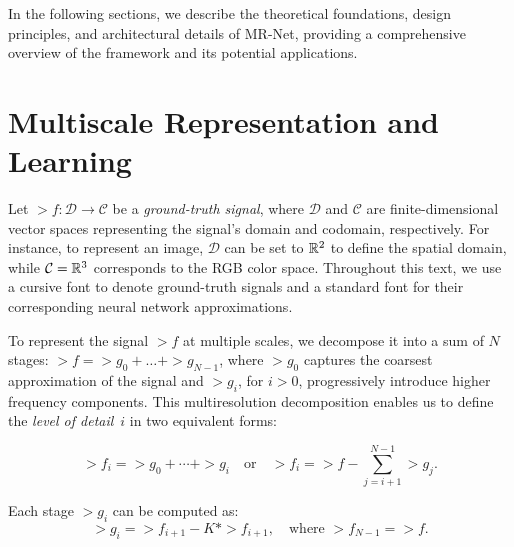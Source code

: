 In the following sections, we describe the theoretical foundations, design principles, and architectural details of MR-Net, providing a comprehensive overview of the framework and its potential applications.



\section{Multiscale Representation and Learning}
\label{s-motivation}


Let $\gt{f}:\mathcal{D}\to \mathcal{C}$ be a \textit{ground-truth signal}, where $\mathcal{D}$ and $\mathcal{C}$ are finite-dimensional vector spaces representing the signal's domain and codomain, respectively. For instance, to represent an image, $\mathcal{D}$ can be set to $\mathbb{R}^2$ to define the spatial domain, while $\mathcal{C}=\mathbb{R}^3$ corresponds to the RGB color space. Throughout this text, we use a cursive font to denote ground-truth signals and a standard font for their corresponding neural network approximations.

To represent the signal $\gt{f}$ at multiple scales, we decompose it into a sum of $N$ stages: $\gt{f}=\gt{g}_0+\dots+\gt{g}_{N-1}$, where $\gt{g}_0$ captures the coarsest approximation of the signal and $\gt{g}_i$, for $i>0$, progressively introduce higher frequency components. This multiresolution decomposition enables us to define the \textit{level of detail}~$i$ in two equivalent forms:

\begin{equation}
\gt{f}_i = \gt{g}_0 + \cdots + \gt{g}_i \quad \text{or} \quad \gt{f}_i = \gt{f} - \sum_{j=i+1}^{N-1} \gt{g}_j.
\end{equation}

Each stage $\gt{g}_i$ can be computed as:
\begin{equation}
\gt{g}_i = \gt{f}_{i+1} - K * \gt{f}_{i+1}, \quad \text{where } \gt{f}_{N-1} = \gt{f}.
\end{equation}

